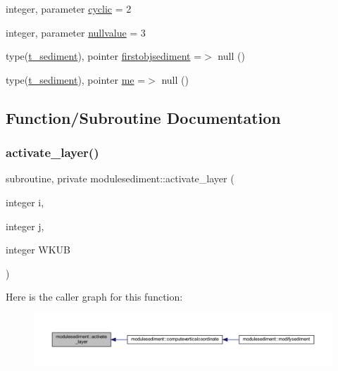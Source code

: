 \begin{DoxyCompactItemize}
integer, parameter \mbox{\hyperlink{namespacemodulesediment_ac4670700ca82bb1af30c31085a5b45d4}{cyclic}} = 2
\item 
integer, parameter \mbox{\hyperlink{namespacemodulesediment_a43439a1d0c16bbfdb3623215dfa24102}{nullvalue}} = 3
\item 
type(\mbox{\hyperlink{structmodulesediment_1_1t__sediment}{t\+\_\+sediment}}), pointer \mbox{\hyperlink{namespacemodulesediment_ab81913d50f9323da1689b4d47d3c8d48}{firstobjsediment}} =$>$ null ()
\item 
type(\mbox{\hyperlink{structmodulesediment_1_1t__sediment}{t\+\_\+sediment}}), pointer \mbox{\hyperlink{namespacemodulesediment_af3acabb996ebbde62db3847cfe45099c}{me}} =$>$ null ()
\end{DoxyCompactItemize}


\subsection{Function/\+Subroutine Documentation}
\mbox{\label{namespacemodulesediment_a2047f2985bf32ff5a12cbd0def21cf95}} 
\subsubsection{\texorpdfstring{activate\+\_\+layer()}{activate\_layer()}}
{\footnotesize\ttfamily subroutine, private modulesediment\+::activate\+\_\+layer (\begin{DoxyParamCaption}\item[{integer}]{i,  }\item[{integer}]{j,  }\item[{integer}]{W\+K\+UB }\end{DoxyParamCaption})\hspace{0.3cm}{\ttfamily [private]}}

Here is the caller graph for this function\+:\nopagebreak
\begin{figure}[H]
\begin{center}
\leavevmode
\includegraphics[width=350pt]{namespacemodulesediment_a2047f2985bf32ff5a12cbd0def21cf95_icgraph}
\end{center}
\end{figure}
\mbox{\label{namespacemodulesediment_aa82529eb8b689ee3ddf738441376e275}} 
